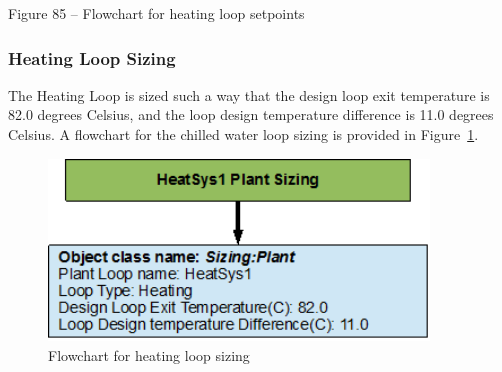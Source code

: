 Figure 85 -- Flowchart for heating loop setpoints

\subsubsection{Heating Loop Sizing}\label{heating-loop-sizing}

The Heating Loop is sized such a way that the design loop exit temperature is 82.0 degrees Celsius, and the loop design temperature difference is 11.0 degrees Celsius. A flowchart for the chilled water loop sizing is provided in Figure~\ref{fig:flowchart-for-heating-loop-sizing}.

\begin{figure}[hbtp] %
\centering
\includegraphics[width=0.9\textwidth, height=0.9\textheight, keepaspectratio=true]{media/image086.png}
\caption{Flowchart for heating loop sizing \protect \label{fig:flowchart-for-heating-loop-sizing}}
\end{figure}
